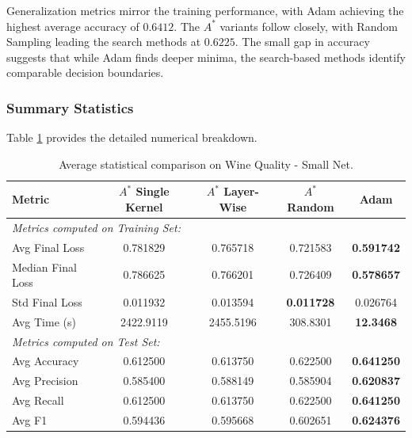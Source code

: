 Generalization metrics mirror the training performance, with Adam achieving the highest average accuracy of $0.6412$. The $A^*$ variants follow closely, with Random Sampling leading the search methods at $0.6225$. The small gap in accuracy suggests that while Adam finds deeper minima, the search-based methods identify comparable decision boundaries.

\subsubsection{Summary Statistics}

Table \ref{tab:small_net_wine} provides the detailed numerical breakdown.

\begin{table}[htbp]
\centering
\scriptsize
\begin{tabular}{|l|c|c|c|c|}
\hline
\textbf{Metric}   & \textbf{$A^*$ Single Kernel} & \textbf{$A^*$ Layer-Wise} & \textbf{$A^*$ Random} & \textbf{Adam} \\ \hline
\multicolumn{5}{|l|}{\textit{Metrics computed on Training Set:}} \\ \hline
Avg Final Loss          & 0.781829                     & 0.765718                  & 0.721583              & \textbf{0.591742} \\ 
Median Final Loss       & 0.786625                     & 0.766201                  & 0.726409              & \textbf{0.578657} \\
Std Final Loss          & 0.011932                     & 0.013594                  & \textbf{0.011728}     & 0.026764      \\ \hline
Avg Time (s)            & 2422.9119                    & 2455.5196                 & 308.8301              & \textbf{12.3468}  \\ \hline
\multicolumn{5}{|l|}{\textit{Metrics computed on Test Set:}} \\ \hline
Avg Accuracy            & 0.612500                     & 0.613750                  & 0.622500              & \textbf{0.641250} \\ 
Avg Precision           & 0.585400                     & 0.588149                  & 0.585904              & \textbf{0.620837} \\ 
Avg Recall              & 0.612500                     & 0.613750                  & 0.622500              & \textbf{0.641250} \\ 
Avg F1                  & 0.594436                     & 0.595668                  & 0.602651              & \textbf{0.624376} \\ \hline
\end{tabular}
\caption{Average statistical comparison on Wine Quality - Small Net.}
\label{tab:small_net_wine}
\end{table}

